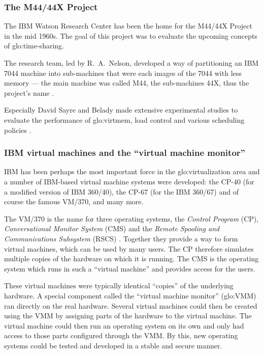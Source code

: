 \subsubsection{The M44/44X Project}

The IBM Watson  Research Center has been the home  for the M44/44X Project
in the  mid 1960s. The goal of  this project was to  evaluate the upcoming
concepts of  \gls{glo:time-sharing}.

The research team, led by R.~A.~Nelson, developed a way of partitioning an
IBM 7044 machine into sub-machines that  were each images of the 7044 with
less memory  --- the  main machine was  called M44, the  sub-machines 44X,
thus the project's name \cite{virtualization-overview}.

Especially David  Sayre and Belady made extensive  experimental studies to
evaluate the  performance of  \gls{glo:virtmem}, load control  and various
scheduling policies \cite{Belady66,denning81}.

\subsubsection{IBM virtual machines and the ``virtual machine monitor''}

IBM    has   been   perhaps    the   most    important   force    in   the
\gls{glo:virtualization} area  and a  number of IBM-based  virtual machine
systems were developed: the CP-40  (for a modified version of IBM 360/40),
the CP-67 (for  the IBM 360/67) and of course the  famous VM/370, and many
more.

The  VM/370 is  the name  for three  operating systems,  the \emph{Control
  Program}  (CP),  \emph{Conversational  Monitor  System}  (CMS)  and  the
\emph{Remote Spooling and Communications Subsystem} (RSCS) \cite{creasy81}.
Together they provide a way to form virtual machines, which can be used by
many users. The CP therefore  simulates multiple copies of the hardware on
which it is running.  The CMS is the operating system which runs in such a
``virtual machine'' and provides access for the users.

These  virtual  machines  were   typically  identical  ``copies''  of  the
underlying  hardware. A  special  component called  the ``virtual  machine
monitor''  (\gls{glo:VMM}) ran  directly  on the  real hardware.   Several
virtual machines could then be created using the VMM by assigning parts of
the hardware to the virtual machine. The virtual machine could then run an
operating system on its own and  only had access to those parts configured
through  the VMM.  By  this, new  operating  systems could  be tested  and
developed in a stable and secure manner.

